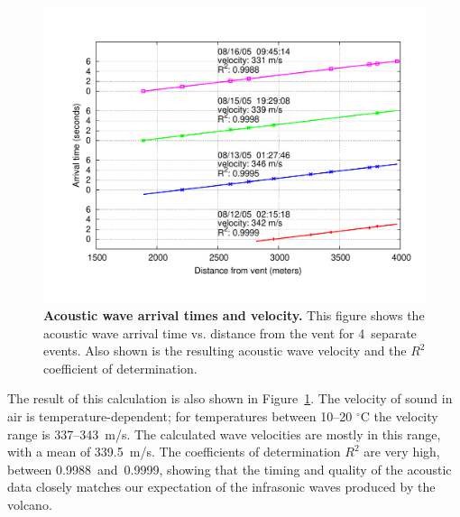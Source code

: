 \begin{figure}[t]
\label{evaluation-fig-acousticArrival}
\begin{center}
\includegraphics[width=\hsize]{./5-evaluation/figs/fidelity/acousticArrival/acoustic.pdf}
\end{center}
\caption{\textbf{Acoustic wave arrival times and velocity.}
This figure shows the acoustic wave arrival time vs. distance from the vent
for 4~separate events. Also shown is the resulting acoustic wave velocity and
  the $R^2$ coefficient of determination.}
\end{figure}

The result of this calculation is also shown in
Figure~\ref{evaluation-fig-acousticArrival}.  The velocity of sound in air is
temperature-dependent; for temperatures between 10--20 $^{\circ}$C the
velocity range is 337--343~m/s.  The calculated wave velocities are mostly in
this range, with a mean of 339.5~m/s. The coefficients of determination $R^2$
are very high, between 0.9988~and~0.9999, showing that the timing and quality
of the acoustic data closely matches our expectation of the infrasonic waves
produced by the volcano.

